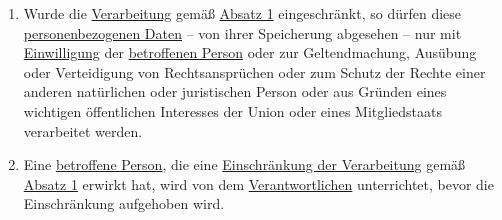 \begin{enumerate}
\begin{enumerate}
  \end{enumerate}

  \item Wurde die \hyperref[itm:04-2]{Verarbeitung} gemäß \hyperref[itm:18-1]{Absatz 1} eingeschränkt, so dürfen
   diese \hyperref[itm:04-1]{personenbezogenen Daten}
   -- von ihrer Speicherung abgesehen -- nur mit \hyperref[itm:04-11]{Einwilligung} der \hyperref[itm:04-1]
      {betroffenen Person} oder zur Geltendmachung, Ausübung oder Verteidigung von Rechtsansprüchen oder zum Schutz der
      Rechte einer anderen natürlichen oder juristischen Person oder aus Gründen eines wichtigen öffentlichen
      Interesses der Union oder eines Mitgliedstaats verarbeitet werden.
  \label{itm:18-2}

  \item Eine \hyperref[itm:04-1]{betroffene Person}, die eine \hyperref[itm:04-3]{Einschränkung der Verarbeitung}
   gemäß \hyperref[itm:18-1]{Absatz 1} erwirkt hat, wird von dem \hyperref[itm:04-7]{Verantwortlichen} unterrichtet,
   bevor die Einschränkung aufgehoben wird.
  \label{itm:18-3}

\end{enumerate}


